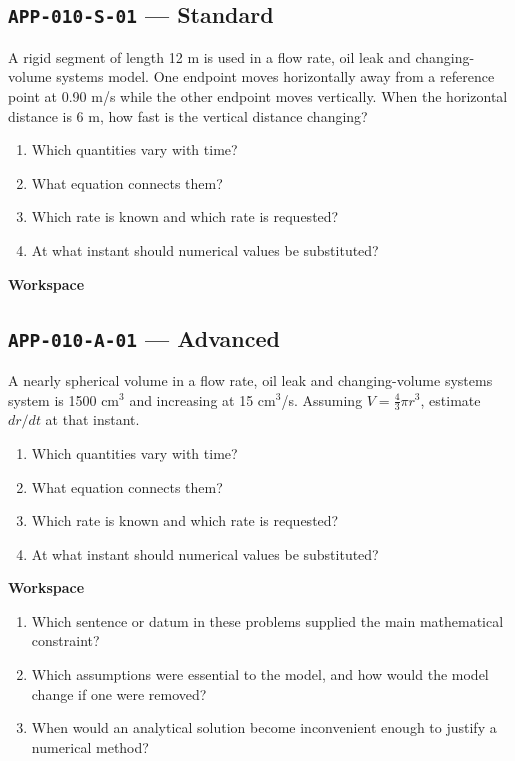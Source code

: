 \documentclass[11pt]{book}
\newcommand{\pid}[1]{\texttt{#1}}
\newcommand{\workspace}{\par\vspace{0.7in}\hrulefill\par\vspace{0.55in}\hrulefill\par}
\begin{document}
\subsection*{\pid{APP-010-S-01} — Standard}
\begin{problembox}
A rigid segment of length 12 m is used in a flow rate, oil leak and changing-volume systems model. One endpoint moves horizontally away from a reference point at 0.90 m/s while the other endpoint moves vertically. When the horizontal distance is 6 m, how fast is the vertical distance changing?
\end{problembox}
\begin{promptbox}\begin{enumerate}
\item Which quantities vary with time?
\item What equation connects them?
\item Which rate is known and which rate is requested?
\item At what instant should numerical values be substituted?
\end{enumerate}\end{promptbox}
\textbf{Workspace}\workspace
{}
\subsection*{\pid{APP-010-A-01} — Advanced}
\begin{problembox}
A nearly spherical volume in a flow rate, oil leak and changing-volume systems system is 1500 cm$^3$ and increasing at 15 cm$^3$/s. Assuming $V=\frac43\pi r^3$, estimate $dr/dt$ at that instant.
\end{problembox}
\begin{promptbox}\begin{enumerate}
\item Which quantities vary with time?
\item What equation connects them?
\item Which rate is known and which rate is requested?
\item At what instant should numerical values be substituted?
\end{enumerate}\end{promptbox}
\textbf{Workspace}\workspace
\begin{reflectionbox}\begin{enumerate}
\item Which sentence or datum in these problems supplied the main mathematical constraint?
\item Which assumptions were essential to the model, and how would the model change if one were removed?
\item When would an analytical solution become inconvenient enough to justify a numerical method?
\end{enumerate}\end{reflectionbox}
\end{document}
